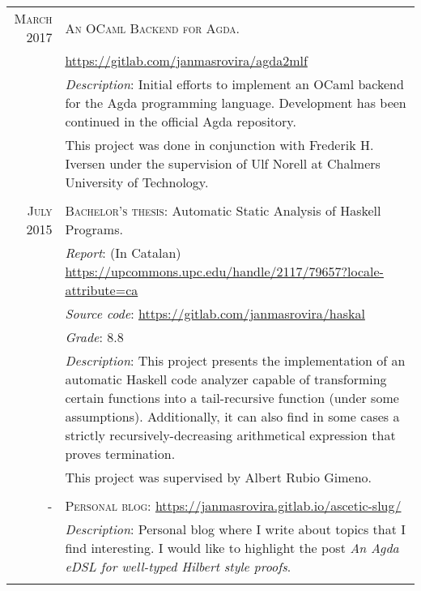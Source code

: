 \documentclass[a4paper,10pt]{article}
\begin{document}
\begin{tabular}{rp{12cm}}
  \textsc{March 2017} & \textsc{An OCaml Backend for Agda}. \\
                     &\url{https://gitlab.com/janmasrovira/agda2mlf} \\
                     &\textit{Description}: Initial efforts to implement an OCaml backend for
                       the Agda programming language. Development has been continued in
                       the official Agda repository.
                       \\&This project was done in conjunction with Frederik H. Iversen under
                       the supervision of Ulf Norell at Chalmers University of Technology. \\
  \multicolumn{2}{c}{} \\

  \textsc{July 2015} & \textsc{Bachelor's thesis}: Automatic Static Analysis of Haskell Programs. \\
                     & \textit{Report}: (In Catalan) \url{https://upcommons.upc.edu/handle/2117/79657?locale-attribute=ca} \\
                     & \textit{Source code}: \url{https://gitlab.com/janmasrovira/haskal} \\
                     & \textit{Grade}: 8.8 \\
                     & \textit{Description}: This project presents the implementation of
                       an automatic Haskell code analyzer capable of transforming certain functions
                       into a tail-recursive function (under some assumptions).
                       Additionally, it can also find in some cases a strictly recursively-decreasing
                       arithmetical expression that proves termination. \\
                     & This project was supervised by Albert Rubio Gimeno. \\
  \multicolumn{2}{c}{} \\
  \textsc{-} & \textsc{Personal blog}:  \url{https://janmasrovira.gitlab.io/ascetic-slug/} \\
                     & \textit{Description}: Personal blog where I write about topics that I find interesting. I would like to highlight the post \textit{An Agda eDSL for well-typed Hilbert style proofs}. \\

    \multicolumn{2}{c}{} \\

\end{tabular}
\end{document}
